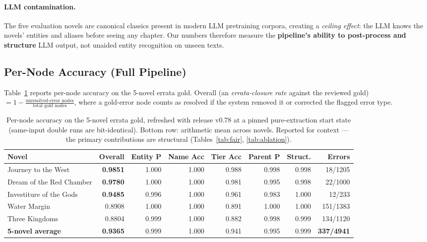 \documentclass[11pt]{article}
\begin{document}
\paragraph{LLM contamination.} The five evaluation novels are canonical classics present in modern LLM pretraining corpora, creating a \textit{ceiling effect}: the LLM knows the novels' entities and aliases before seeing any chapter. Our numbers therefore measure the \textbf{pipeline's ability to post-process and structure} LLM output, not unaided entity recognition on unseen texts.

\subsection{Per-Node Accuracy (Full Pipeline)}

Table~\ref{tab:main} reports per-node accuracy on the 5-novel errata gold. Overall (an \emph{errata-closure rate} against the reviewed gold) $= 1 - \frac{\text{unresolved-error nodes}}{\text{total gold nodes}}$, where a gold-error node counts as resolved if the system removed it or corrected the flagged error type.

\begin{table}[t]
\centering
\footnotesize
\setlength{\tabcolsep}{4pt}
\begin{tabular}{lrrrrrrr}
\toprule
\textbf{Novel} & \textbf{Overall} & \textbf{Entity P} & \textbf{Name Acc} & \textbf{Tier Acc} & \textbf{Parent P} & \textbf{Struct.} & \textbf{Errors} \\
\midrule
Journey to the West & \textbf{0.9851} & 1.000 & 1.000 & 0.988 & 0.998 & 0.998 & 18/1205 \\
Dream of the Red Chamber & \textbf{0.9780} & 1.000 & 1.000 & 0.981 & 0.995 & 0.998 & 22/1000 \\
Investiture of the Gods & \textbf{0.9485} & 0.996 & 1.000 & 0.961 & 0.983 & 1.000 & 12/233 \\
Water Margin & 0.8908 & 1.000 & 1.000 & 0.891 & 1.000 & 1.000 & 151/1383 \\
Three Kingdoms & 0.8804 & 0.999 & 1.000 & 0.882 & 0.998 & 0.999 & 134/1120 \\
\midrule
\textbf{5-novel average} & \textbf{0.9365} & 0.999 & 1.000 & 0.941 & 0.995 & 0.999 & \textbf{337/4941} \\
\bottomrule
\end{tabular}
\caption{Per-node accuracy on the 5-novel errata gold, refreshed with release v0.78 at a pinned pure-extraction start state (same-input double runs are bit-identical). Bottom row: arithmetic mean across novels. Reported for context --- the primary contributions are structural (Tables~\ref{tab:fair}, \ref{tab:ablation}).}
\label{tab:main}
\end{table}
\end{document}
